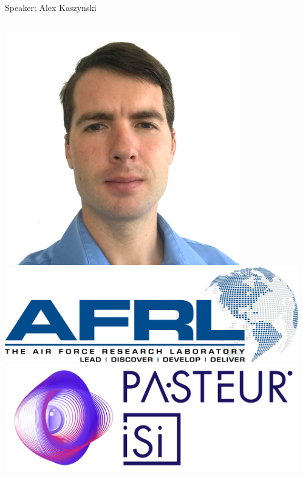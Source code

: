 \documentclass[t]{beamer}
\begin{document}
\begin{frame}{Speaker: Alex Kaszynski}

    \begin{columns}
        \begin{column}{0.3\textwidth}
            \centering
            \includegraphics[width=0.8\textwidth]{figures/alex-kaszynski.png}\\[40pt]
            \includegraphics[width=1.0\textwidth]{figures/afrl-logo.png} \\[40pt]
            \includegraphics[width=1.0\textwidth]{figures/Pasteur.png}
        \end{column}
        \begin{column}{0.7\textwidth}

\end{column}
\end{columns}
\end{frame}
\end{document}
